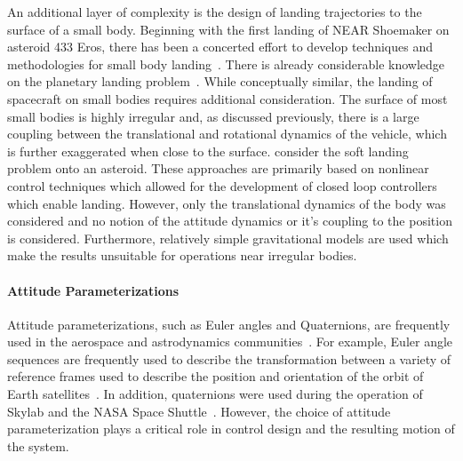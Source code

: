 An additional layer of complexity is the design of landing trajectories to the surface of a small body.
Beginning with the first landing of NEAR Shoemaker on asteroid 433 Eros, there has been a concerted effort to develop techniques and methodologies for small body landing~\cite{dunham2002, kubota2006}.
There is already considerable knowledge on the planetary landing problem~\cite{acikmese2007, meditch1964, ingoldby1978}.
While conceptually similar, the landing of spacecraft on small bodies requires additional consideration. 
The surface of most small bodies is highly irregular and, as discussed previously, there is a large coupling between the translational and rotational dynamics of the vehicle, which is further exaggerated when close to the surface.
\Textcite{guelman1994, furfaro2013, zexu2012} consider the soft landing problem onto an asteroid.
These approaches are primarily based on nonlinear control techniques which allowed for the development of closed loop controllers which enable landing.
However, only the translational dynamics of the body was considered and no notion of the attitude dynamics or it's coupling to the position is considered.
Furthermore, relatively simple gravitational models are used which make the results unsuitable for operations near irregular bodies.

\paragraph{Attitude Parameterizations}\label{ssec:attitude_parameterization}

Attitude parameterizations, such as Euler angles and Quaternions, are frequently used in the aerospace and astrodynamics communities~\cite{vallado2007,wertz1978,hughes2004}.
For example, Euler angle sequences are frequently used to describe the transformation between a variety of reference frames used to describe the position and orientation of the orbit of Earth satellites~\cite{vallado2007,bate1971}.
In addition, quaternions were used during the operation of Skylab and the NASA Space Shuttle~\cite{hughes2004}.
However, the choice of attitude parameterization plays a critical role in control design and the resulting motion of the system.

